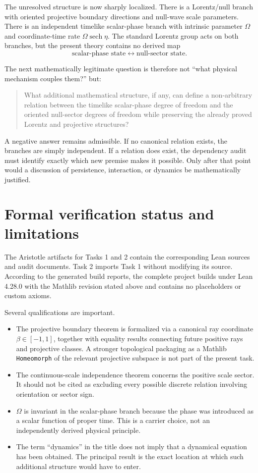 \documentclass[11pt,a4paper]{article}
\newcommand{\sech}{\operatorname{sech}}
\begin{document}
The unresolved structure is now sharply localized.  There is a Lorentz/null branch with oriented projective boundary directions and null-wave scale parameters.  There is an independent timelike scalar-phase branch with intrinsic parameter $\Omega$ and coordinate-time rate $\Omega\sech\eta$.  The standard Lorentz group acts on both branches, but the present theory contains no derived map
\begin{equation}
 \text{scalar-phase state}\longleftrightarrow\text{null-sector state}.
\end{equation}

The next mathematically legitimate question is therefore not ``what physical mechanism couples them?'' but:
\begin{quote}
What additional mathematical structure, if any, can define a non-arbitrary relation between the timelike scalar-phase degree of freedom and the oriented null-sector degrees of freedom while preserving the already proved Lorentz and projective structures?
\end{quote}
A negative answer remains admissible.  If no canonical relation exists, the branches are simply independent.  If a relation does exist, the dependency audit must identify exactly which new premise makes it possible.  Only after that point would a discussion of persistence, interaction, or dynamics be mathematically justified.

\section{Formal verification status and limitations}

The Aristotle artifacts for Tasks 1 and 2 contain the corresponding Lean sources and audit documents.  Task 2 imports Task 1 without modifying its source.  According to the generated build reports, the complete project builds under Lean 4.28.0 with the Mathlib revision stated above and contains no placeholders or custom axioms.

Several qualifications are important.
\begin{itemize}
\item The projective boundary theorem is formalized via a canonical ray coordinate $\beta\in[-1,1]$, together with equality results connecting future positive rays and projective classes.  A stronger topological packaging as a Mathlib \texttt{Homeomorph} of the relevant projective subspace is not part of the present task.
\item The continuous-scale independence theorem concerns the positive scale sector.  It should not be cited as excluding every possible discrete relation involving orientation or sector sign.
\item $\Omega$ is invariant in the scalar-phase branch because the phase was introduced as a scalar function of proper time.  This is a carrier choice, not an independently derived physical principle.
\item The term ``dynamics'' in the title does not imply that a dynamical equation has been obtained.  The principal result is the exact location at which such additional structure would have to enter.
\end{itemize}
\end{document}
